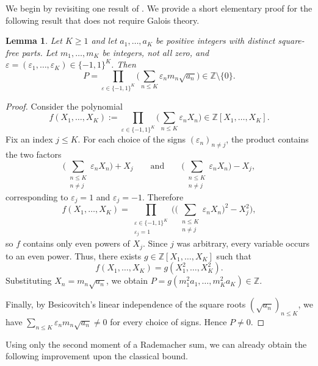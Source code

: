 \documentclass[reqno,12pt]{amsart}
\newtheorem{lemma}[theorem]{Lemma}
\theoremstyle{remark}
\begin{document}
We begin by revisiting one result of \cite{burnikel_et_al_square_roots}. We provide a short elementary proof for the following result that does not require Galois theory.

\begin{lemma}\label{lemma X}
Let $K\geq 1$ and let $a_1,\ldots,a_K$ be positive integers with distinct
square-free parts. Let $m_1,\ldots,m_K$ be integers, not all zero, and $\varepsilon=(\varepsilon_1,\ldots,\varepsilon_K)\in\{-1,1\}^K$. Then
$$ P=\prod_{\varepsilon\in\{-1,1\}^K}\bigg(\sum_{n\leq K}\varepsilon_n m_n\sqrt{a_n}\bigg)\in\mathbb{Z}\setminus\{0\}. $$
\end{lemma}
\begin{proof}
Consider the polynomial
$$ f(X_1,\ldots,X_K) := \prod_{\varepsilon\in\{-1,1\}^K} \Bigg(\sum_{n\leq K}\varepsilon_n X_n\Bigg) \in \mathbb{Z}[X_1,\ldots,X_K]. $$
Fix an index $j\leq K$. For each choice of the signs $(\varepsilon_n)_{n\neq j}$, the product contains the two factors
$$ \Bigg(\sum_{\substack{n\leq K\\ n\neq j}} \varepsilon_n X_n\Bigg) + X_j \qquad\text{and}\qquad
\Bigg(\sum_{\substack{n\leq K\\ n\neq j}} \varepsilon_n X_n\Bigg) - X_j,$$
corresponding to $\varepsilon_j = 1$ and $\varepsilon_j = -1$. Therefore
$$ f(X_1,\ldots,X_K) = \prod_{\substack{\varepsilon\in\{-1,1\}^K \\ \varepsilon_j=1}} \Bigg(\Bigg(\sum_{\substack{n\leq K\\n\neq j}} \varepsilon_n X_n\Bigg)^2 - X_j^2\Bigg), $$
so $f$ contains only even powers of $X_j$. Since $j$ was arbitrary, every variable occurs to an even power. Thus, there exists $g\in \mathbb{Z}[X_1,\ldots,X_K]$ such that
$$ f(X_1,\ldots,X_K) = g(X_1^2,\ldots,X_K^2). $$
Substituting $X_n = m_n\sqrt{a_n}$, we obtain $P = g(m_1^2 a_1,\ldots, m_K^2 a_K)\in \mathbb{Z}$.

Finally, by Besicovitch's \cite{besicovitch_LI} linear independence of the square roots $(\sqrt{a_n})_{n\leq K}$, we have $\sum_{n\leq K}\varepsilon_n m_n\sqrt{a_n}\neq 0$ for every choice of signs. Hence $P\neq 0$.
\end{proof}

Using only the second moment of a Rademacher sum, we can already obtain the following improvement upon the classical bound.
\end{document}
